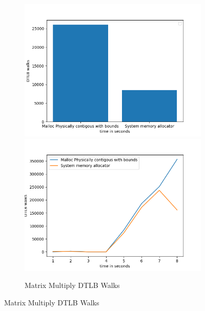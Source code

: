 \begin{figure}
  \begin{subfigure}{\linewidth}
    \includegraphics[width=.5\linewidth]{BenchmarkRuns/MatrixMultiply/dtlb_walk_200_MatrixMultiply.png}\hfill
    \includegraphics[width=.5\linewidth]{BenchmarkRuns/MatrixMultiply/dtlb_walk_1000_MatrixMultiply.png}
  \caption{Matrix Multiply DTLB Walks}
  \end{subfigure}\par\medskip
\end{figure}


